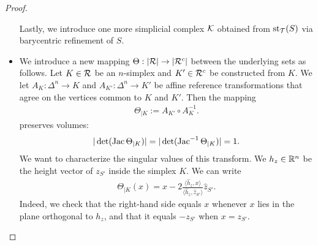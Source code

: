 \documentclass[10pt,a4paper]{article}
\begin{document}
\begin{proof}
\begin{itemize}
        Lastly, we introduce one more simplicial complex ${\mathcal K}$ obtained from $\operatorname{st}_{{\mathcal T}}(S)$ via barycentric refinement of $S$. 
        
        \item 
        We introduce a new mapping $\Theta : |{\mathcal R}| \rightarrow |{\mathcal R}^c|$ between the underlying sets as follows.
        Let $K \in {\mathcal R}$ be an $n$-simplex and $K' \in {\mathcal R}^{c}$ be constructed from $K$.
        We let $A_{K} : \Delta^{n} \rightarrow K$ and $A_{K'} : \Delta^{n} \rightarrow K'$
        be affine reference transformations
        that agree on the vertices common to $K$ and $K'$.
        Then the mapping 
        \begin{align*}
            \Theta_{|K} := A_{K'} \circ A_{K}^{-1}.
        \end{align*}
        preserves volumes:
        \begin{align*}
            |\det( \operatorname{{\rm Jac}}      \Theta_{|K} )|
            = 
            |\det( \operatorname{{\rm Jac}}^{-1} \Theta_{|K} )|
            =
            1
            .
        \end{align*}
        We want to characterize the singular values of this transform. 
        We $h_{z} \in {\mathbb R}^{n}$ be the height vector of $z_{S'}$ inside the simplex $K$.
        We can write
        \begin{align*}
            \Theta_{|K}(x) 
            = 
            x
            - 
            2 \frac{\langle \hat h_{z}, x \rangle}{\langle \hat h_{z}, \hat z_{S'} \rangle}
            \hat z_{S'}
            .
        \end{align*}
        Indeed, we check that the right-hand side equals $x$ whenever $x$ lies in the plane orthogonal to $h_{z}$,
        and that it equals $-z_{S'}$ when $x = z_{S'}$.

\end{itemize}
\end{proof}
\end{document}
